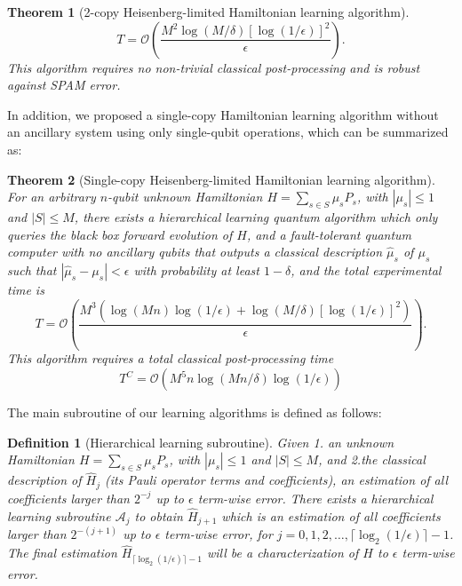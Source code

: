 \documentclass[twocolumn,superscriptaddress,aps,showpacs,amsmath,amstex,amssymb,citeautoscript,floatfix,pra,preprintnumbers]{revtex4-2}
\newcounter{alg}
\newtheorem{theorem}{Theorem}
\theoremstyle{plain}
\theoremstyle{plain}
\theoremstyle{plain}
\theoremstyle{plain}
\theoremstyle{plain}
\theoremstyle{plain}
\newtheorem{defn}{Definition}
\begin{document}
\begin{appendix}
\begin{theorem}[2-copy Heisenberg-limited Hamiltonian learning algorithm]
$$
T = \mathcal{O}\left(\frac{M^2\log(M/\delta)[\log(1/\epsilon)]^2}{\epsilon}\right).
$$
This algorithm requires no non-trivial classical post-processing and is robust against SPAM error.
\end{theorem}





In addition, we proposed a single-copy Hamiltonian learning algorithm without an ancillary system using only single-qubit operations, which can be summarized as:
\begin{theorem}[Single-copy Heisenberg-limited Hamiltonian learning algorithm]
\label{thm:1-copy_learning_alg}
For an arbitrary $n$-qubit unknown Hamiltonian $H=\sum_{s\in S}\mu_s P_{s}$, with $|\mu_s|\leq 1$ and $|S|\leq M$, there exists a hierarchical learning quantum algorithm which only queries the black box forward evolution of $H$, and a fault-tolerant quantum computer with no ancillary qubits that outputs a classical description $\hat{\mu}_s$ of $\mu_s$ such that $|\hat{\mu}_s-\mu_s|<\epsilon$ with probability at least $1-\delta$, and the total experimental time is 
$$
T = \mathcal{O}\left(\frac{M^3(\log(Mn)\log(1/\epsilon) + \log(M/\delta)[\log(1/\epsilon)]^2)}{\epsilon}\right).
$$
This algorithm requires a total classical post-processing time
$$
    T^C = \mathcal{O}\left(M^5n\log(Mn/\delta)\log(1/\epsilon)\right)
$$
\end{theorem}

The main subroutine of our learning algorithms is defined as follows:
\begin{defn}[Hierarchical learning subroutine]
    Given 1. an unknown Hamiltonian $H=\sum_{s\in S} \mu_sP_s$, with $|\mu_s|\leq 1$ and $|S|\leq M$, and 2.the classical description of $\hat{H}_j$ (its Pauli operator terms and coefficients), an estimation of all coefficients larger than $2^{-j}$ up to $\epsilon$ term-wise error. There exists a hierarchical learning subroutine $\mathcal{A}_j$ to obtain $\hat{H}_{j+1}$ which is an estimation of all coefficients larger than $2^{-(j+1)}$ up to $\epsilon$ term-wise error, for $j = 0,1,2,\ldots,\lceil\log_2(1/\epsilon)\rceil-1$. The final estimation $\hat{H}_{\lceil\log_2(1/\epsilon)\rceil-1}$ will be a characterization of $H$ to $\epsilon$ term-wise error.
\end{defn}




\end{appendix}
\end{document}

